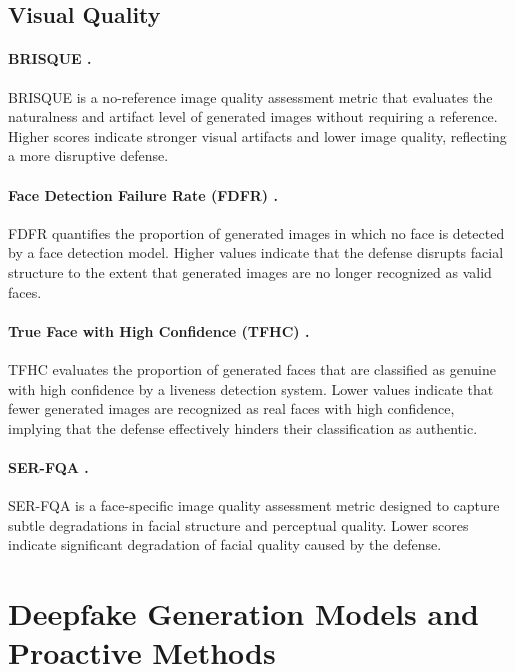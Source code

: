 \documentclass{article}
\begin{document}
\subsection{Visual Quality}
\paragraph{BRISQUE .}
BRISQUE is a no-reference image quality assessment metric that evaluates the naturalness and artifact level of generated images without requiring a reference. Higher scores indicate stronger visual artifacts and lower image quality, reflecting a more disruptive defense.

\paragraph{Face Detection Failure Rate (FDFR) .}
FDFR quantifies the proportion of generated images in which no face is detected by a face detection model. Higher values indicate that the defense disrupts facial structure to the extent that generated images are no longer recognized as valid faces.

\paragraph{True Face with High Confidence (TFHC) .} 
TFHC evaluates the proportion of generated faces that are classified as genuine with high confidence by a liveness detection system. Lower values indicate that fewer generated images are recognized as real faces with high confidence, implying that the defense effectively hinders their classification as authentic.

\paragraph{SER-FQA .}
SER-FQA is a face-specific image quality assessment metric designed to capture subtle degradations in facial structure and perceptual quality. Lower scores indicate significant degradation of facial quality caused by the defense.

\clearpage

\section{Deepfake Generation Models and Proactive Methods}
\label{sec:appendix_deepfake}
\end{document}
